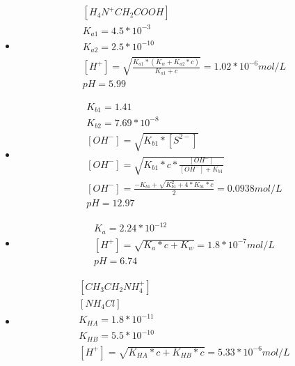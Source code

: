 \documentclass{article}
\begin{document}
\begin{itemize}
    \item
    \begin{equation}
        \begin{multlined}
            \left[H_4N^+CH_2COOH\right]\\
            K_{a1} = 4.5*10^{-3}\\
            K_{a2} = 2.5*10^{-10}\\
            \left[H^+\right] = \sqrt{\frac{K_{a1}*\left(K_w+K_{a2}*c\right)}{K_{a1}+c}} = 1.02*10^{-6} mol/L\\
            pH = 5.99
        \end{multlined}
    \end{equation}
    \item
    \begin{equation}
        \begin{multlined}
            K_{b1} = 1.41\\
            K_{b2} = 7.69*10^{-8}\\
            \left[OH^-\right] = \sqrt{K_{b1}*\left[S^{2-}\right]}\\
            \left[OH^-\right] = \sqrt{K_{b1}*c*\frac{\left[OH^-\right]}{\left[OH^-\right] + K_{b1}}}\\
            \left[OH^-\right] = \frac{-K_{b1}+\sqrt{K_{b1}^2+4*K_{b1}*c}}{2} = 0.0938 mol/L\\
            pH = 12.97
        \end{multlined}
    \end{equation}
    \item
    \begin{equation}
        \begin{multlined}
            K_a = 2.24*10^{-12}\\
            \left[H^+\right] = \sqrt{K_a*c + K_w} = 1.8*10^{-7} mol/L\\
            pH = 6.74
        \end{multlined}
    \end{equation}
    \item
    \begin{equation}
        \begin{multlined}
            \left[CH_3CH_2NH_4^+\right]\\
            \left[NH_4Cl\right]\\
            K_{HA} = 1.8*10^{-11}\\
            K_{HB} = 5.5*10^{-10}\\
            \left[H^+\right] = \sqrt{K_{HA}*c+K_{HB}*c} = 5.33*10^{-6}mol/L\\

\end{multlined}
\end{equation}
\end{itemize}
\end{document}
